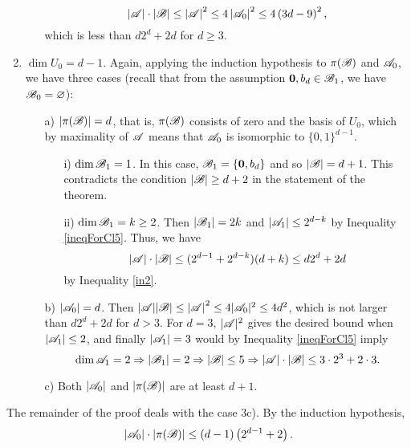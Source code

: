 \begin{enumerate}
\begin{enumerate}
            \begin{equation*}
                \left|{\mathscr{A}}\right|\cdot\left|{\mathscr{B}}\right| \leq \left|{\mathscr{A}}\right|^2 \leq 4\left|{\mathscr{A}}_0\right|^2 \leq 4\left(3d-9\right)^2,
            \end{equation*}
            which is less than $d2^d+2d$ for $d\geq3$. 
        \end{enumerate}
        \item $\operatorname{dim}U_0 = d-1$. Again, applying the induction hypothesis to $\pi({\mathscr{B}})$ and ${\mathscr{A}}_0$, we have three cases (recall that from the assumption $\mathbf{0},b_d\in{\mathscr{B}}_1$, we have ${\mathscr{B}}_0=\varnothing$):
        \begin{enumerate}
            \item[a)] $|\pi({\mathscr{B}})|=d$, that is, $\pi({\mathscr{B}})$ consists of zero and the basis of $U_0$, which by maximality of ${\mathscr{A}}$ means that ${\mathscr{A}}_0$ is isomorphic to $\{0,1\}^{d-1}$.
            \begin{enumerate}
                \item[i)] $\operatorname{dim}{\mathscr{B}}_1=1$. In this case, ${\mathscr{B}}_1=\{\mathbf{0}, b_d\}$ and so $\left|{\mathscr{B}}\right|=d+1$. This contradicts the condition $|{\mathscr{B}}|\ge d+2$ in the statement of the theorem.
                \item[ii)] $\operatorname{dim}{\mathscr{B}}_1=k\geq2$. Then $\left|{\mathscr{B}}_1\right|=2k$ and $\left|{\mathscr{A}}_1\right|\leq2^{d-k}$ by Inequality \ref{ineqForCl5}. Thus, we have
                \begin{equation*}
                    \left|{\mathscr{A}}\right|\cdot\left|{\mathscr{B}}\right|\leq(2^{d-1}+2^{d-k})(d+k) \leq d2^d+2d
                \end{equation*}
                by Inequality \ref{in2}.
            \end{enumerate}
            \item[b)] $\left|{\mathscr{A}}_0\right|=d$. Then $|{\mathscr{A}}||{\mathscr{B}}|\leq\left|{\mathscr{A}}\right|^2\leq4|{\mathscr{A}}_0|^2\leq4d^2$, which is not larger than $d2^d+2d$ for $d>3$. For $d=3$, $|{\mathscr{A}}|^2$ gives the desired bound when $|{\mathscr{A}}_1|\leq2$, and finally $|{\mathscr{A}}_1|=3$ would by Inequality \ref{ineqForCl5} imply 
            \[
                \operatorname{dim}{\mathscr{A}}_1=2 \Rightarrow |{\mathscr{B}}_1|=2 \Rightarrow |{\mathscr{B}}|\leq 5 \Rightarrow |{\mathscr{A}}|\cdot|{\mathscr{B}}|\leq 3\cdot 2^3 + 2\cdot 3.
            \]
            \item[c)] Both $\left|{\mathscr{A}}_0\right|$ and $\left|\pi({\mathscr{B}})\right|$ are at least $d+1$.
        \end{enumerate}
    \end{enumerate}
    The remainder of the proof deals with the case 3c). By the induction hypothesis, \begin{equation*}
            \left|{\mathscr{A}}_0\right|\cdot\left|\pi({\mathscr{B}})\right|\leq\left(d-1\right)\left(2^{d-1}+2\right).
        \end{equation*}
